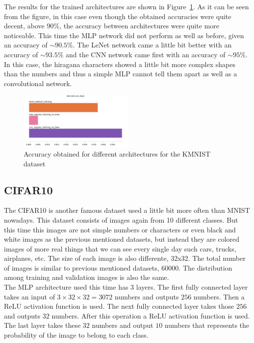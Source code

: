 \documentclass[english,preprint,JIP]{ipsj}
\begin{document}
The results for the trained architectures are shown in
Figure~\ref{fig:kmnist_acc}. As it can be seen from the figure, in this case
even though the obtained accuracies were quite decent, above $90\%$, the
accuracy between architectures were quite more noticeable. This time the MLP
network did not perform as well as before, given an accuracy of $\sim 90.5\%$.
The LeNet network came a little bit better with an accuracy of $\sim 93.5\%$ and
the CNN network came first with an accuracy of $\sim 95\%$. In this case, the
hiragana characters showed a little bit more complex shapes than the numbers and
thus a simple MLP cannot tell them apart as well as a convolutional network.\\

\begin{figure}
    \includegraphics[width=0.5\textwidth]{img/kmnist.png}
    \caption{Accuracy obtained for different architectures for the KMNIST dataset}
    \label{fig:kmnist_acc}
\end{figure}

\subsection{CIFAR10}
The CIFAR10 is another famous dataset used a little bit more often than MNIST
nowadays. This dataset consists of images again from 10 different classes. But
this time this images are not simple numbers or characters or even black and
white images as the previous mentioned datasets, but instead they are colored
images of more real things that we can see every single day such cars, trucks,
airplanes, etc. The size of each image is also differente, 32x32. The total
number of images is similar to previous mentioned datasets, 60000. The
distribution among training and validation images is also the same.\\

The MLP architecture used this time has 3 layers. The first fully connected
layer takes an input of $3\times 32 \times 32 = 3072$ numbers and outputs $256$
numbers. Then a ReLU activation function is used. The next fully connected layer
takes those $256$ and outputs $32$ numbers. After this operation a ReLU
activation function is used. The last layer takes these $32$ numbers and output
$10$ numbers that represents the probability of the image to belong to each
class.\\
\end{document}
